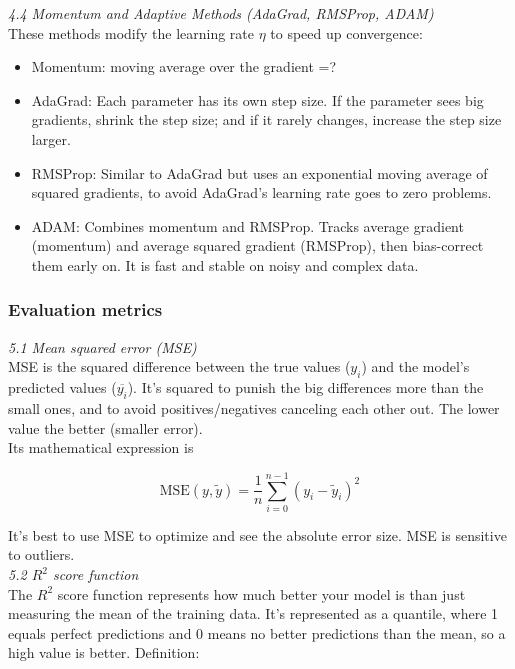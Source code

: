 \documentclass[amssymb,twocolumn,aps]{revtex4-2}
\begin{document}
\textit{4.4 Momentum and Adaptive Methods (AdaGrad, RMSProp, ADAM) } \\

These methods modify the learning rate $\eta$ to speed up convergence: 

\begin{itemize}
    \item Momentum: moving average over the gradient =?
    \item AdaGrad: Each parameter has its own step size. If the parameter sees big gradients, shrink the step size; and if it rarely changes, increase the step size larger. 
    \item RMSProp: Similar to AdaGrad but uses an exponential moving average of squared gradients, to avoid AdaGrad's learning rate goes to zero problems. 
    \item ADAM: Combines momentum and RMSProp. Tracks average gradient (momentum) and average squared gradient (RMSProp), then bias-correct them early on. It is fast and stable on noisy and complex data. 
\end{itemize}

\subsubsection{Evaluation metrics}
\label{subsubsec:eval_theory}

\textit{5.1 Mean squared error (MSE)} \\

MSE is the squared difference between the true values ($y_i$) and the model's predicted values ($\overline{y_i}$). It's squared to punish the big differences more than the small ones, and to avoid positives/negatives canceling each other out. The lower value the better (smaller error). \\

Its mathematical expression is 

\begin{equation}
    \text{MSE}(y, \tilde{y}) = \frac{1}{n} \sum_{i=0}^{n-1} (y_i - \tilde{y}_i)^2 
\end{equation}

It's best to use MSE to optimize and see the absolute error size. MSE is sensitive to outliers. \\

\textit{5.2 $R^2$ score function} \\

The $R^2$ score function represents how much better your model is than just measuring the mean of the training data. It's represented as a quantile, where 1 equals perfect predictions and 0 means no better predictions than the mean, so a high value is better. Definition: 
\end{document}
